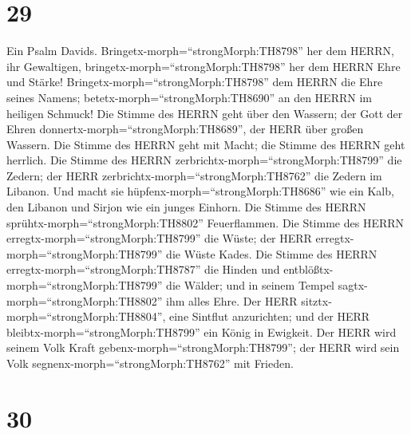 \hypertarget{section-28}{%
\section{29}\label{section-28}}

 Ein Psalm Davids. Bringetx-morph=``strongMorph:TH8798'' her
dem HERRN, ihr Gewaltigen, bringetx-morph=``strongMorph:TH8798'' her dem
HERRN Ehre und Stärke! 
Bringetx-morph=``strongMorph:TH8798'' dem HERRN die Ehre seines Namens;
betetx-morph=``strongMorph:TH8690'' an den HERRN im heiligen Schmuck!
 Die Stimme des HERRN geht über den Wassern; der Gott der
Ehren donnertx-morph=``strongMorph:TH8689'', der HERR über großen
Wassern.  Die Stimme des HERRN geht mit Macht; die Stimme
des HERRN geht herrlich.  Die Stimme des HERRN
zerbrichtx-morph=``strongMorph:TH8799'' die Zedern; der HERR
zerbrichtx-morph=``strongMorph:TH8762'' die Zedern im Libanon.
 Und macht sie hüpfenx-morph=``strongMorph:TH8686'' wie ein
Kalb, den Libanon und Sirjon wie ein junges Einhorn.  Die
Stimme des HERRN sprühtx-morph=``strongMorph:TH8802'' Feuerflammen.
 Die Stimme des HERRN erregtx-morph=``strongMorph:TH8799''
die Wüste; der HERR erregtx-morph=``strongMorph:TH8799'' die Wüste
Kades.  Die Stimme des HERRN
erregtx-morph=``strongMorph:TH8787'' die Hinden und
entblößtx-morph=``strongMorph:TH8799'' die Wälder; und in seinem Tempel
sagtx-morph=``strongMorph:TH8802'' ihm alles Ehre.  Der
HERR sitztx-morph=``strongMorph:TH8804'', eine Sintflut anzurichten; und
der HERR bleibtx-morph=``strongMorph:TH8799'' ein König in Ewigkeit.
 Der HERR wird seinem Volk Kraft
gebenx-morph=``strongMorph:TH8799''; der HERR wird sein Volk
segnenx-morph=``strongMorph:TH8762'' mit Frieden.

\hypertarget{section-29}{%
\section{30}\label{section-29}}

